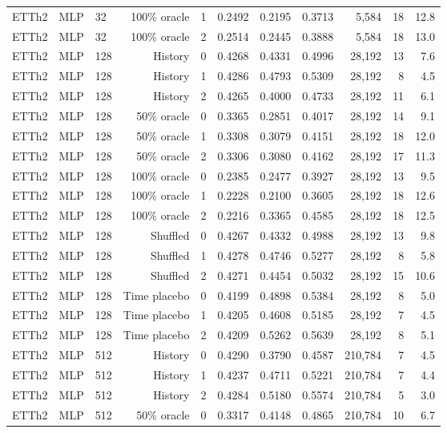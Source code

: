 \begin{landscape}
\begin{longtable}{@{}lllrlrrrrrr@{}}
ETTh2 & MLP & 32 & 100\% oracle & 1 & 0.2492 & 0.2195 & 0.3713 & 5,584 & 18 & 12.8 \\
ETTh2 & MLP & 32 & 100\% oracle & 2 & 0.2514 & 0.2445 & 0.3888 & 5,584 & 18 & 13.0 \\
ETTh2 & MLP & 128 & History & 0 & 0.4268 & 0.4331 & 0.4996 & 28,192 & 13 & 7.6 \\
ETTh2 & MLP & 128 & History & 1 & 0.4286 & 0.4793 & 0.5309 & 28,192 & 8 & 4.5 \\
ETTh2 & MLP & 128 & History & 2 & 0.4265 & 0.4000 & 0.4733 & 28,192 & 11 & 6.1 \\
ETTh2 & MLP & 128 & 50\% oracle & 0 & 0.3365 & 0.2851 & 0.4017 & 28,192 & 14 & 9.1 \\
ETTh2 & MLP & 128 & 50\% oracle & 1 & 0.3308 & 0.3079 & 0.4151 & 28,192 & 18 & 12.0 \\
ETTh2 & MLP & 128 & 50\% oracle & 2 & 0.3306 & 0.3080 & 0.4162 & 28,192 & 17 & 11.3 \\
ETTh2 & MLP & 128 & 100\% oracle & 0 & 0.2385 & 0.2477 & 0.3927 & 28,192 & 13 & 9.5 \\
ETTh2 & MLP & 128 & 100\% oracle & 1 & 0.2228 & 0.2100 & 0.3605 & 28,192 & 18 & 12.6 \\
ETTh2 & MLP & 128 & 100\% oracle & 2 & 0.2216 & 0.3365 & 0.4585 & 28,192 & 18 & 12.5 \\
ETTh2 & MLP & 128 & Shuffled & 0 & 0.4267 & 0.4332 & 0.4988 & 28,192 & 13 & 9.8 \\
ETTh2 & MLP & 128 & Shuffled & 1 & 0.4278 & 0.4746 & 0.5277 & 28,192 & 8 & 5.8 \\
ETTh2 & MLP & 128 & Shuffled & 2 & 0.4271 & 0.4454 & 0.5032 & 28,192 & 15 & 10.6 \\
ETTh2 & MLP & 128 & Time placebo & 0 & 0.4199 & 0.4898 & 0.5384 & 28,192 & 8 & 5.0 \\
ETTh2 & MLP & 128 & Time placebo & 1 & 0.4205 & 0.4608 & 0.5185 & 28,192 & 7 & 4.5 \\
ETTh2 & MLP & 128 & Time placebo & 2 & 0.4209 & 0.5262 & 0.5639 & 28,192 & 8 & 5.1 \\
ETTh2 & MLP & 512 & History & 0 & 0.4290 & 0.3790 & 0.4587 & 210,784 & 7 & 4.5 \\
ETTh2 & MLP & 512 & History & 1 & 0.4237 & 0.4711 & 0.5221 & 210,784 & 7 & 4.4 \\
ETTh2 & MLP & 512 & History & 2 & 0.4284 & 0.5180 & 0.5574 & 210,784 & 5 & 3.0 \\
ETTh2 & MLP & 512 & 50\% oracle & 0 & 0.3317 & 0.4148 & 0.4865 & 210,784 & 10 & 6.7 \\

\end{longtable}
\end{landscape}
